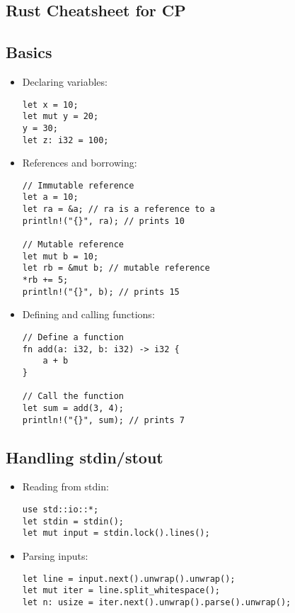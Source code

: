 \documentclass[letterpaper,landscape]{article}
\begin{document}
\begin{multicols*}{3}

\section*{Rust Cheatsheet for CP}

\subsection*{Basics}

\begin{itemize}
\item Declaring variables:
\begin{verbatim}
let x = 10; 
let mut y = 20; 
y = 30;
let z: i32 = 100;
\end{verbatim}

\item References and borrowing:
\begin{verbatim}
// Immutable reference
let a = 10;
let ra = &a; // ra is a reference to a
println!("{}", ra); // prints 10

// Mutable reference
let mut b = 10;
let rb = &mut b; // mutable reference
*rb += 5; 
println!("{}", b); // prints 15
\end{verbatim}

\item Defining and calling functions:
\begin{verbatim}
// Define a function
fn add(a: i32, b: i32) -> i32 {
    a + b
}

// Call the function
let sum = add(3, 4); 
println!("{}", sum); // prints 7
\end{verbatim}

\end{itemize}

\subsection*{Handling stdin/stout}
\begin{itemize}
\item Reading from stdin:
\begin{verbatim}
use std::io::*;
let stdin = stdin();
let mut input = stdin.lock().lines();
\end{verbatim}

\item Parsing inputs:
\begin{verbatim}
let line = input.next().unwrap().unwrap();
let mut iter = line.split_whitespace();
let n: usize = iter.next().unwrap().parse().unwrap();
\end{verbatim}


\end{itemize}
\end{multicols*}
\end{document}
